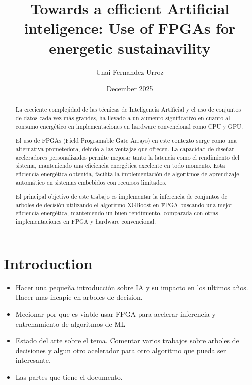 \documentclass[conference, 10pt]{IEEEtran}
\title{Towards a efficient Artificial inteligence: Use of FPGAs for energetic sustainavility}
\author{Unai Fernandez Urroz}
\date{December 2025}
\begin{document}
\maketitle

\begin{abstract}

La creciente complejidad de las técnicas de Inteligencia Artificial y el uso de conjuntos de 
datos cada vez más grandes, ha llevado a un aumento significativo en cuanto al consumo 
energético en implementaciones en hardware convencional como CPU y GPU.  


El uso de FPGAs (Field Programable Gate Arrays) en este contexto surge como una alternativa prometedora, debido a las
ventajas que ofrecen. La capacidad de diseñar aceleradores personalizados permite mejorar tanto la latencia como el
rendimiento del sistema, manteniendo una eficiencia energética excelente en todo momento. Esta eficiencia energética
obtenida, facilita la implementación de algoritmos de aprendizaje automático en sistemas embebidos con recursos
limitados.

El principal objetivo de este trabajo es implementar la inferencia de conjuntos de arboles de 
decisión utilizando el algoritmo XGBoost en FPGA buscando una mejor eficiencia energética, 
manteniendo un buen rendimiento, comparada con otras implementaciones en FPGA y hardware convencional.


\end{abstract}
\section{Introduction}

\begin{itemize}
	\item Hacer una pequeña introducción sobre IA y su impacto en los ultimos años. Hacer mas incapie en arboles de decision.
	\item Mecionar por que es viable usar FPGA para acelerar inferencia y entrenamiento de algoritmos de ML
	\item Estado del arte sobre el tema. Comentar varios trabajos sobre arboles de decisiones y algun otro acelerador para otro algoritmo que pueda ser interesante.
	\item Las partes que tiene el documento.
\end{itemize}
\end{document}
